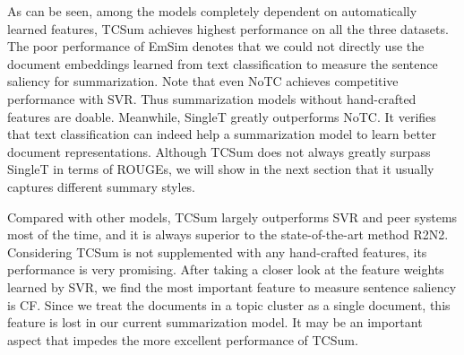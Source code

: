\documentclass[letterpaper]{article}
\begin{document}
As can be seen, among the models completely dependent on automatically learned features, TCSum achieves highest performance on all the three datasets.
The poor performance of EmSim denotes that we could not directly use the document embeddings learned from text classification to measure the sentence saliency for summarization.
Note that even NoTC achieves competitive performance with SVR.
Thus summarization models without hand-crafted features are doable. 
Meanwhile, SingleT greatly outperforms NoTC.
It verifies that text classification can indeed help a summarization model to learn better document representations.
Although TCSum does not always greatly surpass SingleT in terms of ROUGEs, we will show in the next section that it usually captures different summary styles.

Compared with other models, TCSum largely outperforms SVR and peer systems most of the time, and it is always superior to the state-of-the-art method R2N2.
Considering TCSum is not supplemented with any hand-crafted features, its performance is very promising.
After taking a closer look at the feature weights learned by SVR, we find the most important feature to measure sentence saliency is CF.
Since we treat the documents in a topic cluster as a single document, this feature is lost in our current summarization model.
It may be an important aspect that impedes the more excellent performance of TCSum.  
\end{document}

